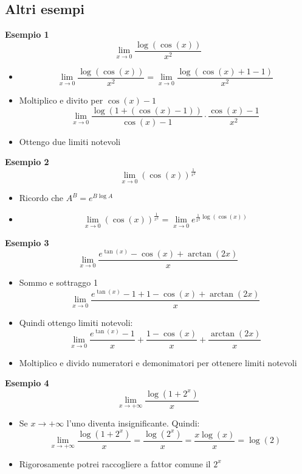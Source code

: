 \subsection{Altri esempi}
\textbf{Esempio 1}
\[
	\lim_{x \to  0} \frac{\log \left( \cos \left( x \right)  \right) }{x^2}
\]
\begin{itemize}
	\item
	      \[
		      \lim_{x \to  0} \frac{\log \left( \cos \left( x \right)  \right) }{x^2}  = \lim_{x \to 0} \frac{\log\left( \cos \left( x \right) +1 -1 \right) }{x^2}
	      \]
	\item Moltiplico e divito per $\cos\left( x \right) -1$
	      \[
		      \lim_{x \to 0} \frac{\log \left( 1+ \left( \cos \left( x \right) -1 \right)  \right) }{\cos \left( x \right) -1} \cdot \frac{\cos \left( x \right) -1}{x^2}
	      \]
	\item Ottengo due limiti notevoli
\end{itemize}
\textbf{Esempio 2}
\[
	\lim_{x \to 0} \left( \cos\left( x \right) \right) ^{\frac{1}{x^2}}
\]
\begin{itemize}
	\item Ricordo che $A^{B}=e^{B\log A}$
	\item
	      \[
		      \lim_{x \to 0} \left( \cos\left( x \right) \right) ^{\frac{1}{x^2}}  = \lim_{x \to 0} e^{\frac{1}{x^2}\log\left( \cos\left( x \right)  \right) }
	      \]
\end{itemize}
\textbf{Esempio 3}
\[
	\lim_{x \to 0} \frac{e^{\tan \left( x \right) }- \cos\left( x \right) + \arctan \left( 2x \right) }{x}
\]
\begin{itemize}
	\item Sommo e sottraggo 1
	      \[
		      \lim_{x \to 0} \frac{e^{\tan \left( x \right) }-1 + 1- \cos\left( x \right) + \arctan \left( 2x \right) }{x}
	      \]
	\item Quindi ottengo limiti notevoli:
	      \[
		      \lim_{x \to 0} \frac{e^{\tan \left( x \right) }-1}{x}+ \frac{1-\cos\left( x \right) }{x} + \frac{\arctan \left( 2x \right) }{x}
	      \]
	\item Moltiplico e divido numeratori e demonimatori per ottenere limiti notevoli
\end{itemize}
\textbf{Esempio 4}
\[
	\lim_{x \to +\infty} \frac{\log\left( 1+2^{x} \right) }{x}
\]
\begin{itemize}
	\item Se $x \to + \infty$ l'uno diventa insignificante. Quindi:
	      \[
		      \lim_{x \to +\infty} \frac{\log\left( 1+2^{x} \right) }{x}= \frac{\log\left( 2^{x} \right) }{x} = \frac{x \log\left( x \right) }{x}  = \log\left( 2 \right)
	      \]
	\item Rigorosamente potrei raccogliere a fattor comune il $2^{x}$
\end{itemize}
